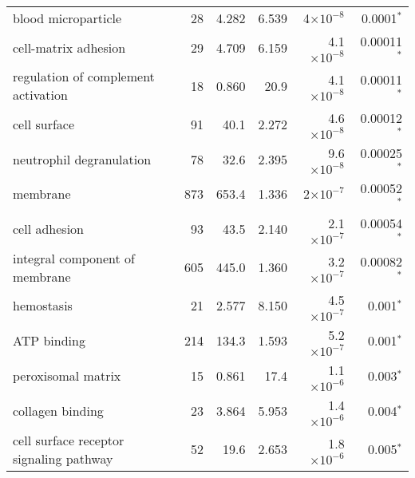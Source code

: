 \begin{longtable}{|l|r|r|r|r|r|}
                               blood microparticle &                      28 &                   4.282 &      6.539 &    4$\times 10^{-8}$ &               0.0001$\bm{^*}$ \\
                              cell-matrix adhesion &                      29 &                   4.709 &      6.159 &  4.1$\times 10^{-8}$ &              0.00011$\bm{^*}$ \\
               regulation of complement activation &                      18 &                   0.860 &       20.9 &  4.1$\times 10^{-8}$ &              0.00011$\bm{^*}$ \\
                                      cell surface &                      91 &                    40.1 &      2.272 &  4.6$\times 10^{-8}$ &              0.00012$\bm{^*}$ \\
                          neutrophil degranulation &                      78 &                    32.6 &      2.395 &  9.6$\times 10^{-8}$ &              0.00025$\bm{^*}$ \\
                                          membrane &                     873 &                   653.4 &      1.336 &    2$\times 10^{-7}$ &              0.00052$\bm{^*}$ \\
                                     cell adhesion &                      93 &                    43.5 &      2.140 &  2.1$\times 10^{-7}$ &              0.00054$\bm{^*}$ \\
                    integral component of membrane &                     605 &                   445.0 &      1.360 &  3.2$\times 10^{-7}$ &              0.00082$\bm{^*}$ \\
                                        hemostasis &                      21 &                   2.577 &      8.150 &  4.5$\times 10^{-7}$ &                0.001$\bm{^*}$ \\
                                       ATP binding &                     214 &                   134.3 &      1.593 &  5.2$\times 10^{-7}$ &                0.001$\bm{^*}$ \\
                                peroxisomal matrix &                      15 &                   0.861 &       17.4 &  1.1$\times 10^{-6}$ &                0.003$\bm{^*}$ \\
                                  collagen binding &                      23 &                   3.864 &      5.953 &  1.4$\times 10^{-6}$ &                0.004$\bm{^*}$ \\
           cell surface receptor signaling pathway &                      52 &                    19.6 &      2.653 &  1.8$\times 10^{-6}$ &                0.005$\bm{^*}$ \\

\end{longtable}
